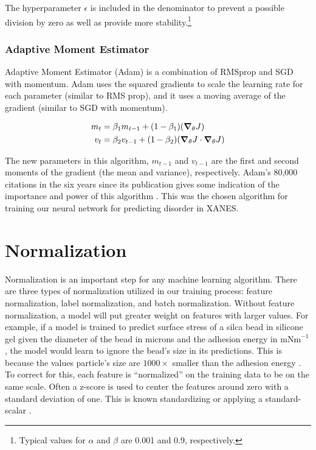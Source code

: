 \noindent The hyperparameter $ \epsilon $ is included in the denominator to prevent a possible division by zero as well as provide more stability.\footnote{Typical values for $ \alpha $  and $ \beta $  are 0.001 and 0.9, respectively.} 

\subsubsection{Adaptive Moment Estimator}
Adaptive Moment Estimator (Adam) is a combination of RMSprop and SGD with momentum. Adam uses the squared gradients to scale the learning rate for each parameter (similar to RMS prop), and it uses a moving average of the gradient (similar to SGD with momentum).

\begin{align} 
    \begin{split} 
    m_t &= \beta_1 m_{t-1} + (1 - \beta_1) (\grad_\theta J) \\ 
    v_t &= \beta_2 v_{t-1} + (1 - \beta_2) (\grad_\theta J \cdot \grad_\theta J) 
    \end{split} 
\end{align}

\noindent The new parameters in this algorithm, $ m_{t-1} $ and $ v_{t-1} $ are the first and second moments of the gradient (the mean and variance), respectively. Adam's 80,000 citations in the six years since its publication gives some indication of the importance and power of this algorithm \cite{orig-ADAM-paper}. This was the chosen algorithm for training our neural network for predicting disorder in XANES.

\section{Normalization}
Normalization is an important step for any machine learning algorithm. There are three types of normalization utilized in our training process: feature normalization, label normalization, and batch normalization. Without feature normalization, a model will put greater weight on features with larger values. For example, if a model is trained to predict surface stress of a silca bead in silicone gel given the diameter of the bead in microns and the adhesion energy in $ \text{mNm}^{-1} $, the model would learn to ignore the bead's size in its predictions. This is because the values particle's size are $ 1000\times $ smaller than the adhesion energy \cite{williamsThesis}. To correct for this, each feature is ``normalized'' on the training data to be on the same scale. Often a z-score is used to center the features around zero with a standard deviation of one. This is known standardizing or applying a standard-scalar \cite{statsTextbook}.

